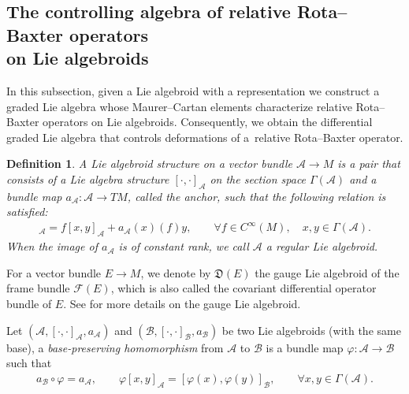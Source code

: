 \documentclass[10pt,a4paper]{amsart}
\numberwithin{equation}{section}
\newtheorem{defi}[thm]{Definition}
\newcommand{\huaA}{\mathcal{A}}
\newcommand{\huaB}{\mathcal{B}}
\newcommand{\huaF}{\mathcal{F}}
\newcommand{\frkD}{\mathfrak D}
\newcommand{\CWM}{C^{\infty}(M)}
\begin{document}
\subsection[The controlling algebra of relative Rota--Baxter operators on Lie algebroids]
{The controlling algebra of relative Rota--Baxter operators \\on Lie algebroids}

In this subsection, given a Lie algebroid with a representation we construct a graded Lie algebra whose Maurer--Cartan elements characterize relative Rota--Baxter operators on Lie algebroids. Consequently, we obtain the differential graded Lie algebra that controls deformations of a~rela\-tive Rota--Baxter operator.

\begin{defi}
A {\it Lie algebroid} structure on a vector bundle $\huaA\longrightarrow M$ is
a pair that consists of a Lie algebra structure $[\cdot,\cdot]_\huaA$ on
the section space $\Gamma(\huaA)$ and a bundle map
$a_\huaA\colon \huaA\longrightarrow TM$, called the anchor, such that the
following relation is satisfied:
\begin{gather*}
[x,fy]_\huaA=f[x,y]_\huaA+a_\huaA(x)(f)y,\qquad \forall f\in
\CWM,\quad x,y\in\Gamma(\huaA).
\end{gather*}
When the image of $a_\huaA$ is of constant rank, we call $\huaA$ a {\it regular Lie algebroid}.
\end{defi}

For a vector bundle $E\longrightarrow M$, we denote by $\frkD(E)$ the gauge Lie algebroid of the frame bundle $\huaF(E)$, which is also called the covariant differential operator bundle of $E$. See \cite{General-theory-of-Lie-groupoid-and-Lie-algebroid} for more details on the gauge Lie algebroid.

Let $(\huaA,[\cdot,\cdot]_\huaA,a_\huaA)$ and $(\huaB,[\cdot,\cdot]_\huaB,a_\huaB)$ be two Lie
algebroids (with the same base), a {\it base-preserving homomorphism}
from $\huaA$ to $\huaB$ is a bundle map $\varphi\colon \huaA\longrightarrow \huaB$ such
that
\begin{eqnarray*}
 a_\huaB\circ\varphi=a_\huaA,\qquad
 \varphi[x,y]_\huaA=[\varphi(x),\varphi(y)]_\huaB,\qquad \forall x,y\in\Gamma(\huaA).
\end{eqnarray*}
\end{document}
